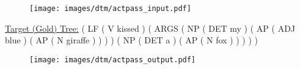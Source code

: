 \begin{figure}[H]
\vskip 0.2in
\begin{center}
\centerline{\texttt{[image: images/dtm/actpass\_input.pdf]}}
\end{center}
\vskip -0.2in
\end{figure}

\underline{Target (Gold) Tree:}
\hspace{.15in} ( LF ( V kissed ) ( ARGS ( NP ( DET my ) ( AP ( ADJ blue ) ( AP ( N giraffe ) ) ) ) ( NP ( DET a ) ( AP ( N fox ) ) ) ) )

\begin{figure}[H]
\vskip 0.2in
\begin{center}
\centerline{\texttt{[image: images/dtm/actpass\_output.pdf]}}
\end{center}
\vskip -0.2in
\end{figure}